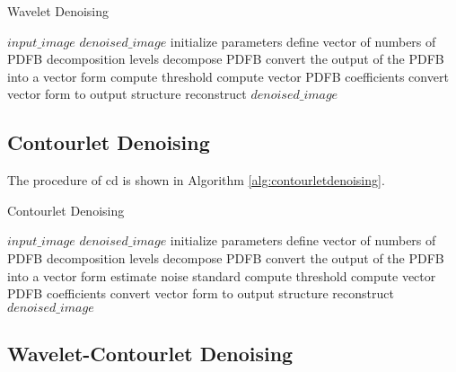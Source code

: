 \begin{algorithm}
	\caption{Wavelet Denoising}\label{alg:waveletdenoising}
	\begin{algorithmic}[1]
		\Require $input\_image$
		\Ensure $denoised\_image$
			\State initialize parameters
			\State define vector of numbers of PDFB decomposition levels  
			\State decompose PDFB 
			\State convert the output of the PDFB into a vector form 
			\State compute threshold 
			\State compute vector PDFB coefficients 
			\State convert vector form to output structure 
			\State reconstruct $denoised\_image$ 
		\EndProcedure
	\end{algorithmic}
\end{algorithm}


\subsection{Contourlet Denoising}
The procedure of \gls{cd} is shown in Algorithm \ref{alg:contourletdenoising}.


\begin{algorithm}
	\caption{Contourlet Denoising}\label{alg:contourletdenoising}
	\begin{algorithmic}[1]
		\Require $input\_image$
		\Ensure $denoised\_image$
		\State initialize parameters
		\State define vector of numbers of PDFB decomposition levels  
		\State decompose PDFB 
		\State convert the output of the PDFB into a vector form 
		\State estimate noise standard 
		\State compute threshold 
		\State compute vector PDFB coefficients  
		\State convert vector form to output structure 
		\State reconstruct $denoised\_image$ 
		\EndProcedure
	\end{algorithmic}
\end{algorithm}


\subsection{Wavelet-Contourlet Denoising}

